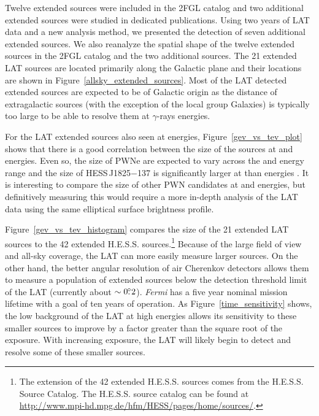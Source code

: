 \documentclass[12pt,preprint]{aastex}
\newcommand{\gev}{\text{GeV}\xspace}
\newcommand{\tev}{\text{TeV}\xspace}
\newcommand{\fermi}{\textit{Fermi}\xspace}
\begin{document}
Twelve extended sources were included in the 2FGL catalog and two additional extended
sources were studied in dedicated publications.  Using two years of
LAT data and a new analysis method, we presented the detection of seven
additional extended sources.  We also reanalyze the spatial shape of the
twelve extended sources in the 2FGL catalog and the two additional sources.  The 21
extended LAT sources are located primarily along the Galactic plane
and their locations are shown in Figure~\ref{allsky_extended_sources}.
Most of the LAT detected extended sources are expected to be of Galactic
origin as the distance of extragalactic sources (with the exception of
the local group Galaxies) is typically too large to be able to resolve
them at $\gamma$-rays energies.

For the LAT extended sources also seen at \tev energies,
Figure~\ref{gev_vs_tev_plot} shows that there is a good correlation
between the size of the sources at \gev and \tev energies. Even so,
the size of PWNe are expected to vary across the \gev and \tev energy
range and the size of HESS\,J1825$-$137 is significantly larger at
\gev than \tev energies \citep{fermi_hess_j1825}.  It is interesting
to compare the size of other PWN candidates at \gev and \tev energies,
but definitively measuring this would require a more in-depth analysis
of the LAT data using the same elliptical surface brightness profile.

Figure~\ref{gev_vs_tev_histogram} compares the size of the 21 extended
LAT sources to the 42 extended H.E.S.S. sources.\footnote{The 
\tev extension of
the 42 extended H.E.S.S. sources comes from the H.E.S.S. Source
Catalog. The H.E.S.S. source catalog can be found at \url{http://www.mpi-hd.mpg.de/hfm/HESS/pages/home/sources/}.}
Because of the large
field of view and all-sky coverage, the LAT can more easily measure
larger sources.  On the other hand, the 
better
angular resolution of air Cherenkov detectors allows them to measure a
population of extended sources below the detection threshold limit of the LAT (currently 
about $\sim0\mbox{$.\!\!^\circ$}2$).  \fermi has a five year nominal mission lifetime with
a goal of ten years of operation.  As Figure~\ref{time_sensitivity} shows,
the low background of the LAT at high energies allows its sensitivity 
to
these smaller sources to improve by a factor greater than the square root
of the exposure.  With increasing exposure, the LAT will likely begin to
detect and resolve some of these smaller \tev sources.
\end{document}
